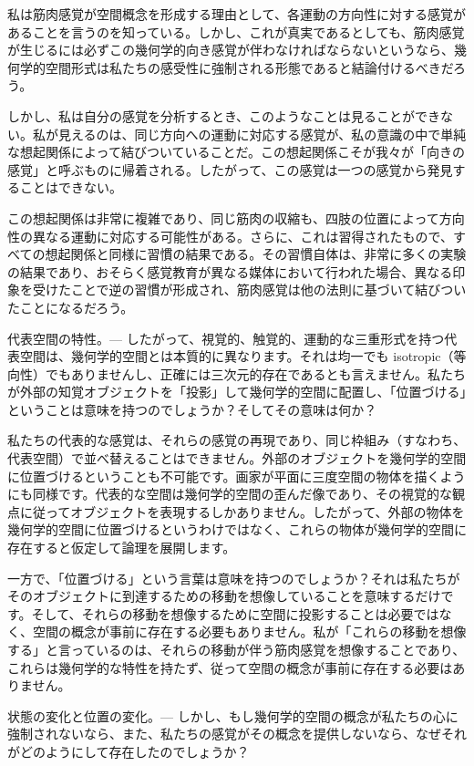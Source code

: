 \documentclass[a4paper,11pt,openany]{ltjsbook}
\begin{document}
私は筋肉感覚が空間概念を形成する理由として、各運動の方向性に対する感覚があることを言うのを知っている。しかし、これが真実であるとしても、筋肉感覚が生じるには必ずこの幾何学的向き感覚が伴わなければならないというなら、幾何学的空間形式は私たちの感受性に強制される形態であると結論付けるべきだろう。

しかし、私は自分の感覚を分析するとき、このようなことは見ることができない。私が見えるのは、同じ方向への運動に対応する感覚が、私の意識の中で単純な想起関係によって結びついていることだ。この想起関係こそが我々が「向きの感覚」と呼ぶものに帰着される。したがって、この感覚は一つの感覚から発見することはできない。

この想起関係は非常に複雑であり、同じ筋肉の収縮も、四肢の位置によって方向性の異なる運動に対応する可能性がある。さらに、これは習得されたもので、すべての想起関係と同様に習慣の結果である。その習慣自体は、非常に多くの実験の結果であり、おそらく感覚教育が異なる媒体において行われた場合、異なる印象を受けたことで逆の習慣が形成され、筋肉感覚は他の法則に基づいて結びついたことになるだろう。

代表空間の特性。— したがって、視覚的、触覚的、運動的な三重形式を持つ代表空間は、幾何学的空間とは本質的に異なります。それは均一でも isotropic（等向性）でもありませんし、正確には三次元的存在であるとも言えません。私たちが外部の知覚オブジェクトを「投影」して幾何学的空間に配置し、「位置づける」ということは意味を持つのでしょうか？そしてその意味は何か？

私たちの代表的な感覚は、それらの感覚の再現であり、同じ枠組み（すなわち、代表空間）で並べ替えることはできません。外部のオブジェクトを幾何学的空間に位置づけるということも不可能です。画家が平面に三度空間の物体を描くようにも同様です。代表的な空間は幾何学的空間の歪んだ像であり、その視覚的な観点に従ってオブジェクトを表現するしかありません。したがって、外部の物体を幾何学的空間に位置づけるというわけではなく、これらの物体が幾何学的空間に存在すると仮定して論理を展開します。

一方で、「位置づける」という言葉は意味を持つのでしょうか？それは私たちがそのオブジェクトに到達するための移動を想像していることを意味するだけです。そして、それらの移動を想像するために空間に投影することは必要ではなく、空間の概念が事前に存在する必要もありません。私が「これらの移動を想像する」と言っているのは、それらの移動が伴う筋肉感覚を想像することであり、これらは幾何学的な特性を持たず、従って空間の概念が事前に存在する必要はありません。

状態の変化と位置の変化。— しかし、もし幾何学的空間の概念が私たちの心に強制されないなら、また、私たちの感覚がその概念を提供しないなら、なぜそれがどのようにして存在したのでしょうか？
\end{document}
